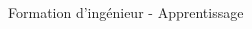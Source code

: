 \documentclass[t,compress,mathserif,12pt,xcolor=dvipsnames]{beamer}
\begin{document}
\begin{frame}[t]{Formation d'ingénieur - Apprentissage}
\begin{minipage}[t][5.0cm][t]{\textwidth}
\begin{columns}[T]
\begin{column}{0.04\textwidth}
      \end{column}
      \begin{column}{0.33\textwidth}
      \end{column}
    \end{columns}
  \end{minipage}
  \begin{figure}[htp]

\end{figure}
\end{frame}
\end{document}

